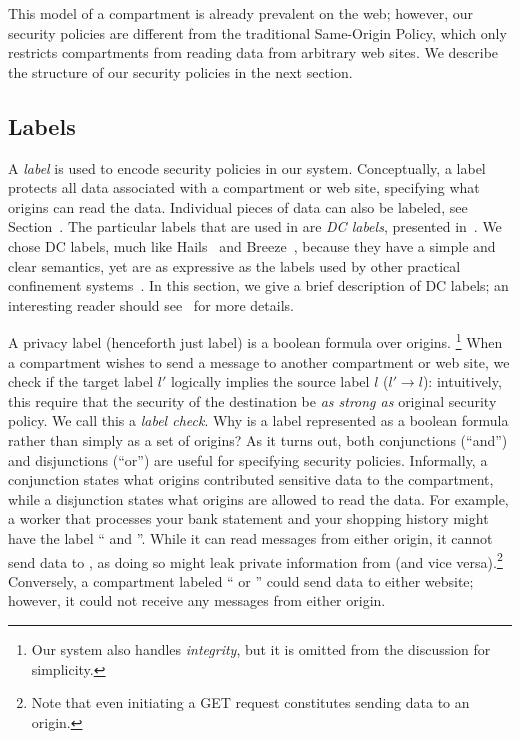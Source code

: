 This model of a compartment is already prevalent on the web; however,
our security policies are different from the traditional Same-Origin
Policy, which only restricts compartments from reading data from
arbitrary web sites.
%
We describe the structure of our security policies in the next section.

\subsection{Labels}
\label{sec:labels}

A \emph{label} is used to encode security policies in our system.
%
Conceptually, a label protects all data associated with a compartment or
web site, specifying what origins can read the data.
%
Individual pieces of data can also be labeled, see Section~.
%
The particular labels that are used in \sys{} are \emph{DC labels},
presented in~\cite{stefan:2011:dclabels}.
%
We chose DC labels, much like Hails~\cite{giffin:2012:hails} and
Breeze~\cite{Breeze13}, because they have a simple and clear
semantics, yet are as expressive as the labels used by other practical
confinement systems~\cite{GenLabels}.
%
In this section, we give a brief description of DC labels; an interesting
reader should see~\cite{stefan:2011:dclabels} for more details.

A privacy label (henceforth just label) is a boolean formula over
origins.%
%
\footnote{
  Our system also handles \emph{integrity}, but it is omitted from
  the discussion for simplicity.
}
%
When a compartment wishes to send a message to another compartment or
web site, we check if the target label $l'$ logically implies the source
label $l$ ($l' \rightarrow l$): intuitively, this require that the security of the destination be
\emph{as strong as} original security policy.
%
We call this a \emph{label check}.
%
Why is a label represented as a boolean formula rather than simply
as a set of origins?
%
As it turns out, both conjunctions (``and'')
and disjunctions (``or'') are useful for specifying security policies.
%
Informally, a conjunction states what origins contributed sensitive data
to the compartment, while a disjunction states what origins are allowed
to read the data.
%
For example, a worker that processes your bank statement and your shopping
history might have the label `` and ''.
%
While it can read messages from either origin, it cannot send data to
, as doing so might leak private information from
 (and vice versa).\footnote{Note that even initiating a
GET request constitutes sending data to an origin.}
%
Conversely, a compartment labeled `` or ''
could send data to either website; however, it could not receive any
messages from either origin.

